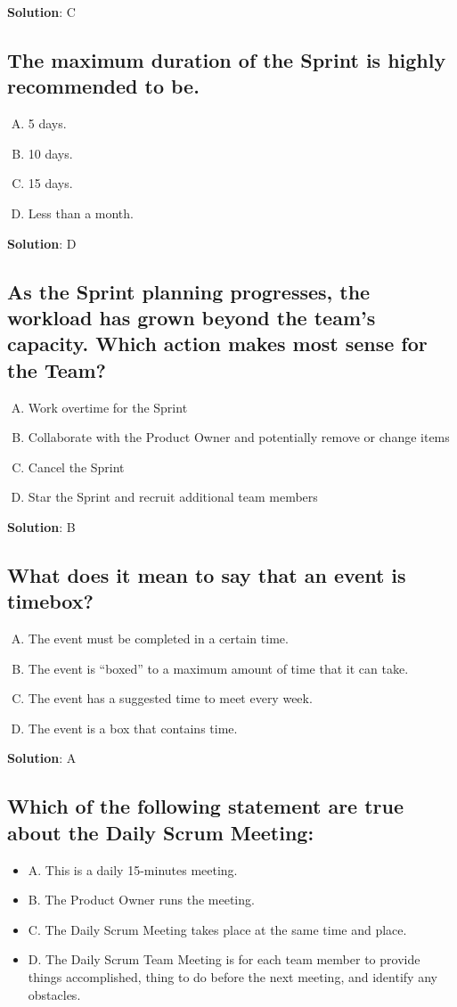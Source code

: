 \textbf{Solution}: C


\subsection{The maximum duration of the Sprint is highly recommended to be.}
\begin{enumerate}[A)]
  \item 5 days.
  \item 10 days.
  \item 15 days.
  \item Less than a month.
\end{enumerate}


\textbf{Solution}: D


\subsection{As the Sprint planning progresses, the workload has grown beyond the team's capacity. Which action makes most sense for the Team?}
\begin{enumerate}[A)]
  \item Work overtime for the Sprint
  \item Collaborate with the Product Owner and potentially remove or change items
  \item Cancel the Sprint
  \item Star the Sprint and recruit additional team members
\end{enumerate}


\textbf{Solution}: B


\subsection{What does it mean to say that an event is timebox?}
\begin{enumerate}[A)]
  \item The event must be completed in a certain time.
  \item The event is \enquote{boxed} to a maximum amount of time that it can take.
  \item The event has a suggested time to meet every week.
  \item The event is a box that contains time.
\end{enumerate}


\textbf{Solution}: A


\subsection{Which of the following statement are true about the Daily Scrum Meeting:}
\begin{itemize}
  \item A. This is a daily 15-minutes meeting.
  \item B. The Product Owner runs the meeting.
  \item C. The Daily Scrum Meeting takes place at the same time and place.
  \item D. The Daily Scrum Team Meeting is for each team member to provide things accomplished, thing to do before the next meeting, and identify any obstacles.
\end{itemize}


